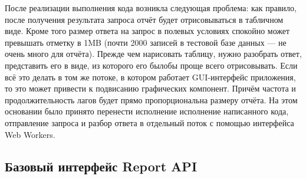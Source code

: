 \documentclass[12pt]{article}
\begin{document}
    После реализации выполнения кода возникла следующая проблема: как правило, после получения результата запроса отчёт будет отрисовываться в
    табличном виде. Кроме того размер ответа на запрос в полевых условиях спокойно может превышать отметку в 1MB (почти 2000 записей в тестовой
    базе данных --- не очень много для отчёта). Прежде чем нарисовать таблицу, нужно разобрать ответ, представить его в виде, из которого его
    былобы проще всего отрисовывать. Если всё это делать в том же потоке, в котором работает GUI-интерфейс приложения, то это может привести
    к подвисанию графических компонент. Причём частота и продолжительность лагов будет прямо пропорциональна размеру отчёта. На этом
    основании было принято перенести исполнение исполнение написанного кода, отправление запроса и разбор ответа в отдельный поток
    с помощью интерфейса Web Workers.

    \subsection{Базовый интерфейс Report API}
\end{document}
